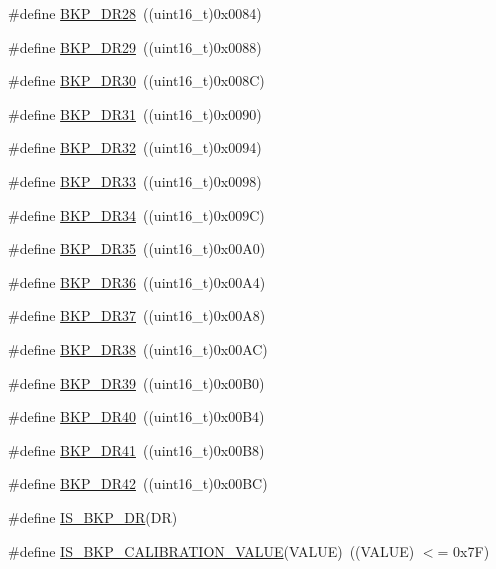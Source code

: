 \begin{DoxyCompactItemize}
\#define \hyperlink{group___data___backup___register_ga02762501319f1b7e7c01b56d45c45cf9}{B\+K\+P\+\_\+\+D\+R28}~((uint16\+\_\+t)0x0084)
\item 
\#define \hyperlink{group___data___backup___register_ga94e935c3e7ce7261d1823e888a8216c5}{B\+K\+P\+\_\+\+D\+R29}~((uint16\+\_\+t)0x0088)
\item 
\#define \hyperlink{group___data___backup___register_ga7114464779c0f0e008ec79f66aac9568}{B\+K\+P\+\_\+\+D\+R30}~((uint16\+\_\+t)0x008\+C)
\item 
\#define \hyperlink{group___data___backup___register_gadb5b953e765da9d658600151dde63fa3}{B\+K\+P\+\_\+\+D\+R31}~((uint16\+\_\+t)0x0090)
\item 
\#define \hyperlink{group___data___backup___register_gaecc9c23e89fff9a5846305ec391d5cda}{B\+K\+P\+\_\+\+D\+R32}~((uint16\+\_\+t)0x0094)
\item 
\#define \hyperlink{group___data___backup___register_ga9a52ed4d0d70fc9d815d5e15945ad0d8}{B\+K\+P\+\_\+\+D\+R33}~((uint16\+\_\+t)0x0098)
\item 
\#define \hyperlink{group___data___backup___register_ga8553dfcf67aad9107544cf52bf0a54a5}{B\+K\+P\+\_\+\+D\+R34}~((uint16\+\_\+t)0x009\+C)
\item 
\#define \hyperlink{group___data___backup___register_ga54e494fd651d2e1970ab7e5d6528af21}{B\+K\+P\+\_\+\+D\+R35}~((uint16\+\_\+t)0x00\+A0)
\item 
\#define \hyperlink{group___data___backup___register_ga212028eb8d981756b3bc78492434d19a}{B\+K\+P\+\_\+\+D\+R36}~((uint16\+\_\+t)0x00\+A4)
\item 
\#define \hyperlink{group___data___backup___register_ga6c11b636a33c5b352d267355e502b34d}{B\+K\+P\+\_\+\+D\+R37}~((uint16\+\_\+t)0x00\+A8)
\item 
\#define \hyperlink{group___data___backup___register_ga88f4c7dd39ba83b66159b2c808275a09}{B\+K\+P\+\_\+\+D\+R38}~((uint16\+\_\+t)0x00\+A\+C)
\item 
\#define \hyperlink{group___data___backup___register_ga1656f56588b474b1f48bb96380cdfd4a}{B\+K\+P\+\_\+\+D\+R39}~((uint16\+\_\+t)0x00\+B0)
\item 
\#define \hyperlink{group___data___backup___register_ga17e0d382ac43abed1663846b5aecc09a}{B\+K\+P\+\_\+\+D\+R40}~((uint16\+\_\+t)0x00\+B4)
\item 
\#define \hyperlink{group___data___backup___register_gae1e184afc030987396716ddfad008e81}{B\+K\+P\+\_\+\+D\+R41}~((uint16\+\_\+t)0x00\+B8)
\item 
\#define \hyperlink{group___data___backup___register_ga557d35e490957616b02672005f516542}{B\+K\+P\+\_\+\+D\+R42}~((uint16\+\_\+t)0x00\+B\+C)
\item 
\#define \hyperlink{group___data___backup___register_gaff069cf5458ccf0a94e2f784e2d610b8}{I\+S\+\_\+\+B\+K\+P\+\_\+\+DR}(DR)
\item 
\#define \hyperlink{group___data___backup___register_gafc3386eaa5383b64e9d706e5fe8dc1cf}{I\+S\+\_\+\+B\+K\+P\+\_\+\+C\+A\+L\+I\+B\+R\+A\+T\+I\+O\+N\+\_\+\+V\+A\+L\+UE}(V\+A\+L\+UE)~((V\+A\+L\+UE) $<$= 0x7\+F)
\end{DoxyCompactItemize}


